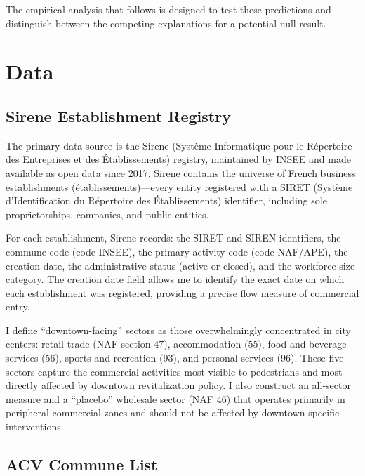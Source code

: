 \documentclass[12pt]{article}
\begin{document}
The empirical analysis that follows is designed to test these predictions and distinguish between the competing explanations for a potential null result.

\section{Data}
\label{sec:data}

\subsection{Sirene Establishment Registry}

The primary data source is the Sirene (Syst\`eme Informatique pour le R\'epertoire des Entreprises et des \'Etablissements) registry, maintained by INSEE and made available as open data since 2017. Sirene contains the universe of French business establishments (\'etablissements)---every entity registered with a SIRET (Syst\`eme d'Identification du R\'epertoire des \'Etablissements) identifier, including sole proprietorships, companies, and public entities.

For each establishment, Sirene records: the SIRET and SIREN identifiers, the commune code (code INSEE), the primary activity code (code NAF/APE), the creation date, the administrative status (active or closed), and the workforce size category. The creation date field allows me to identify the exact date on which each establishment was registered, providing a precise flow measure of commercial entry.

I define ``downtown-facing'' sectors as those overwhelmingly concentrated in city centers: retail trade (NAF section 47), accommodation (55), food and beverage services (56), sports and recreation (93), and personal services (96). These five sectors capture the commercial activities most visible to pedestrians and most directly affected by downtown revitalization policy. I also construct an all-sector measure and a ``placebo'' wholesale sector (NAF 46) that operates primarily in peripheral commercial zones and should not be affected by downtown-specific interventions.

\subsection{ACV Commune List}
\end{document}
